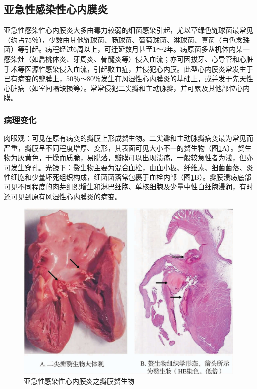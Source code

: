 \subsection{亚急性感染性心内膜炎}

亚急性感染性心内膜炎大多由毒力较弱的细菌感染引起，尤以草绿色链球菌最常见（约占75％），少数由其他链球菌、肠球菌、葡萄球菌、淋球菌、真菌（白色念珠菌）等引起。病程经过6周以上，可迁延数月甚至1～2年。病原菌多从机体内某一感染灶（如扁桃体炎、牙周炎、骨髓炎等）侵入血流；亦可因拔牙、心导管和心脏手术等医源性感染侵入血流，引起败血症，并侵犯心内膜。此型心内膜炎常发生于已有病变的瓣膜上，50％～80％发生在风湿性心内膜炎的基础上，或并发于先天性心脏病（如室间隔缺损等）。常常侵犯二尖瓣和主动脉瓣，并可累及其他部位心内膜。

\subsubsection{病理变化}

肉眼观：可见在原有病变的瓣膜上形成赘生物。二尖瓣和主动脉瓣病变最为常见而严重，瓣膜呈不同程度增厚、变形，其表面可见大小不一的赘生物（图\ref{fig6-12}A）。赘生物为灰黄色，干燥而质脆，易脱落，瓣膜可以出现溃疡，一般较急性者为浅，但亦可发生穿孔。光镜下：赘生物主要为混合血栓，由血小板、纤维素、细菌菌落、炎性细胞和少量坏死组织构成，细菌菌落常包裹于血栓内部（图\ref{fig6-12}B）。瓣膜溃疡底部可见不同程度的肉芽组织增生和淋巴细胞、单核细胞及少量中性白细胞浸润，有时还可见到原有风湿性心内膜炎的病变。

\begin{figure}[!htbp]
    \centering
    \includegraphics{./images/Image00104.jpg}
    \captionsetup{justification=centering}
    \caption{亚急性感染性心内膜炎之瓣膜赘生物}
    \label{fig6-12}
\end{figure}

